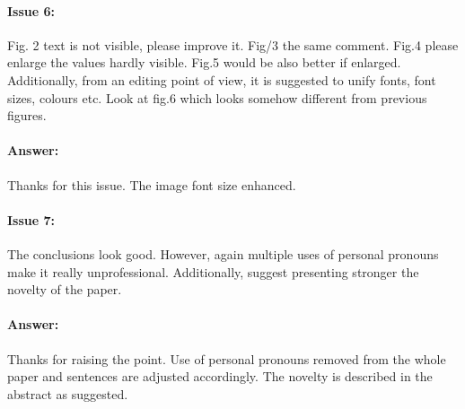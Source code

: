 \documentclass{article}
\begin{document}
\paragraph{Issue 6:}
\begin{displayquote}
Fig. 2 text is not visible, please improve it.  Fig/3 the same comment. Fig.4 please enlarge the values hardly visible. Fig.5 would be also better if enlarged. Additionally, from an editing point of view, it is suggested to unify fonts, font sizes, colours etc. Look at fig.6 which looks somehow different from previous figures.
\end{displayquote}

\paragraph{Answer:}
Thanks for this issue. The image font size enhanced.

\paragraph{Issue 7:}
\begin{displayquote}
The conclusions look good. However, again multiple uses of personal pronouns make it really unprofessional. Additionally, suggest presenting stronger the novelty of the paper.

\end{displayquote}

\paragraph{Answer:}
Thanks for raising the point. Use of personal pronouns removed from the whole paper and sentences are adjusted accordingly. The novelty is described in the abstract as suggested. 
\end{document}
